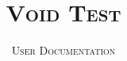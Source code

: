 \geometry{margin=25mm}

\title{\textsc{\huge\textbf{Void Test}}}
\author{\textsc{\large User Documentation}}
\date{\vspace{5mm}}

\newcommand{\voidtest}{\textsc{\small Void~Test}}
\newcommand{\cplusplus}{\textsc{C}\texttt{\small\raisebox{.5pt}{++}}}
